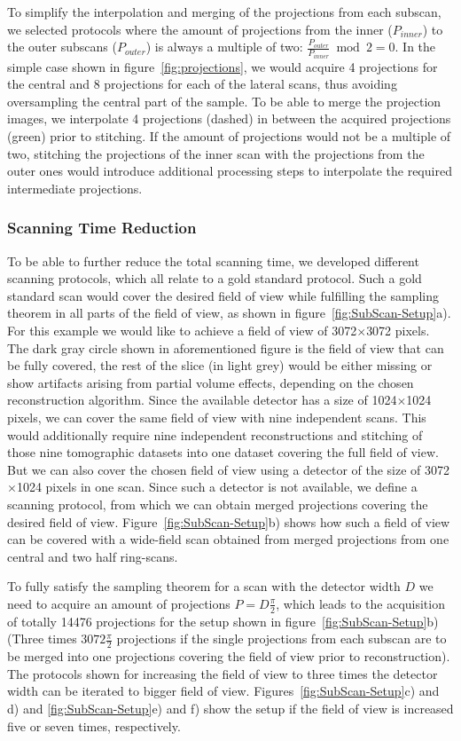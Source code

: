 To simplify the interpolation and merging of the projections from each subscan, we selected protocols where the amount of projections from the inner ($P_{inner}$) to the outer subscans ($P_{outer}$) is always a multiple of two: $\frac{P_{outer}}{P_{inner}} \bmod 2 = 0$. In the simple case shown in figure~\ref{fig:projections}, we would acquire 4 projections for the central and 8 projections for each of the lateral scans, thus avoiding oversampling the central part of the sample. To be able to merge the projection images, we interpolate 4 projections (dashed) in between the acquired projections (green) prior to stitching. If the amount of projections would not be a multiple of two, stitching the projections of the inner scan with the projections from the outer ones would introduce additional processing steps to interpolate the required intermediate projections.

\subsubsection{Scanning Time Reduction}%
To be able to further reduce the total scanning time, we developed different scanning protocols, which all relate to a gold standard protocol. Such a gold standard scan would cover the desired field of view while fulfilling the sampling theorem in all parts of the field of view, as shown in figure~\ref{fig:SubScan-Setup}a). For this example we would like to achieve a field of view of 3072$\times$3072 pixels. The dark gray circle shown in aforementioned figure is the field of view that can be fully covered, the rest of the slice (in light grey) would be either missing or show artifacts arising from partial volume effects, depending on the chosen reconstruction algorithm. Since the available detector has a size of 1024$\times$1024 pixels, we can cover the same field of view with nine independent scans. This would additionally require nine independent reconstructions and stitching of those nine tomographic datasets into one dataset covering the full field of view. But we can also cover the chosen field of view using a detector of the size of 3072$\times$1024 pixels in one scan. Since such a detector is not available, we define a scanning protocol, from which we can obtain merged projections covering the desired field of view. Figure~\ref{fig:SubScan-Setup}b) shows how such a field of view can be covered with a wide-field scan obtained from merged projections from one central and two half ring-scans.

To fully satisfy the sampling theorem for a scan with the detector width $D$ we need to acquire an amount of projections $P=D\frac{\pi}{2}$, which leads to the acquisition of totally 14476 projections for the setup shown in figure~\ref{fig:SubScan-Setup}b) (Three times $3072\frac{\pi}{2}$ projections if the single projections from each subscan are to be merged into one projections covering the field of view prior to reconstruction). The protocols shown for increasing the field of view to three times the detector width can be iterated to bigger field of view. Figures~\ref{fig:SubScan-Setup}c) and d) and \ref{fig:SubScan-Setup}e) and f) show the setup if the field of view is increased five or seven times, respectively.

